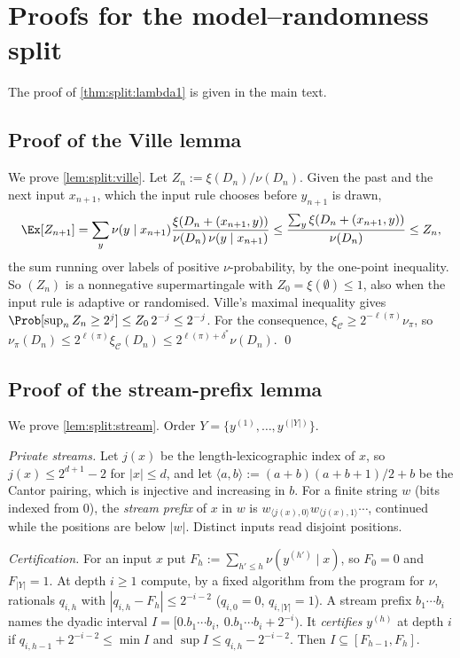 \section{Proofs for the model--randomness split}\label{app:split}

The proof of \cref{thm:split:lambda1} is given in the main text.

\subsection{Proof of the Ville lemma}\label{app:split:ville}

We prove \cref{lem:split:ville}. Let $Z_n:=\xi(D_n)/\nu(D_n)$. Given the past and the next input $x_{n+1}$, which the input rule chooses before $y_{n+1}$ is drawn,
\[
\Ex[Z_{n+1}]=\sum_y\nu(y\mid x_{n+1})\frac{\xi(D_n+(x_{n+1},y))}{\nu(D_n)\,\nu(y\mid x_{n+1})}\le\frac{\sum_y\xi(D_n+(x_{n+1},y))}{\nu(D_n)}\le Z_n,
\]
the sum running over labels of positive $\nu$-probability, by the one-point inequality. So $(Z_n)$ is a nonnegative supermartingale with $Z_0=\xi(\emptyset)\le1$, also when the input rule is adaptive or randomised. Ville's maximal inequality \citep{ville1939etude} gives $\Prob[\sup_nZ_n\ge2^j]\le Z_0\,2^{-j}\le2^{-j}$. For the consequence, $\xi_{\mathcal C}\ge2^{-\ell(\pi)}\nu_\pi$, so $\nu_\pi(D_n)\le2^{\ell(\pi)}\xi_{\mathcal C}(D_n)\le2^{\ell(\pi)+\delta^*}\nu(D_n)$. \qed

\subsection{Proof of the stream-prefix lemma}\label{app:split:stream}

We prove \cref{lem:split:stream}. Order $Y=\{y^{(1)},\dots,y^{(|Y|)}\}$.

\emph{Private streams.} Let $j(x)$ be the length-lexicographic index of $x$, so $j(x)\le2^{d+1}-2$ for $|x|\le d$, and let $\langle a,b\rangle:=(a+b)(a+b+1)/2+b$ be the Cantor pairing, which is injective and increasing in $b$. For a finite string $w$ (bits indexed from $0$), the \emph{stream prefix} of $x$ in $w$ is $w_{\langle j(x),0\rangle}w_{\langle j(x),1\rangle}\cdots$, continued while the positions are below $|w|$. Distinct inputs read disjoint positions.

\emph{Certification.} For an input $x$ put $F_h:=\sum_{h'\le h}\nu(y^{(h')}\mid x)$, so $F_0=0$ and $F_{|Y|}=1$. At depth $i\ge1$ compute, by a fixed algorithm from the program for $\nu$, rationals $q_{i,h}$ with $|q_{i,h}-F_h|\le2^{-i-2}$ ($q_{i,0}=0$, $q_{i,|Y|}=1$). A stream prefix $b_1\cdots b_i$ names the dyadic interval $I=[0.b_1\cdots b_i,\ 0.b_1\cdots b_i+2^{-i})$. It \emph{certifies} $y^{(h)}$ at depth $i$ if $q_{i,h-1}+2^{-i-2}\le\min I$ and $\sup I\le q_{i,h}-2^{-i-2}$. Then $I\subseteq[F_{h-1},F_h]$.

